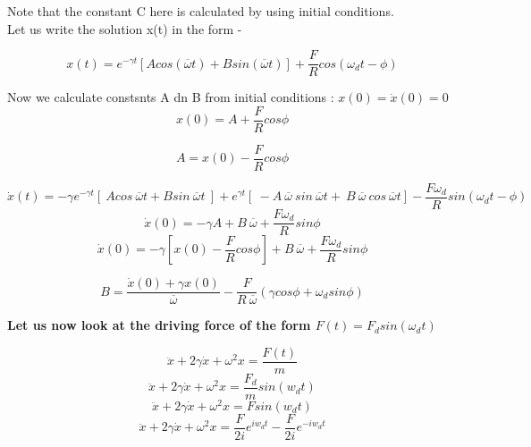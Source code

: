 \documentclass{book}
\begin{document}
Note that the constant C here is calculated by using initial conditions.\\

Let us write the solution x(t) in the form - 
\begin{tcolorbox}[colback=pink!30!white, colframe=black, width=\textwidth, boxrule=0.5mm, sharp corners, left=1mm, right=1mm, top=1mm, bottom=1mm]
\[ x(t) =  e^{- \gamma t}[Acos(\overline{\omega} t) + B sin(\overline{\omega } t)] + \frac{F}{R} cos(\omega_d t - \phi)\]
\end{tcolorbox}

Now we calculate constsnts A dn B from initial conditions : \(x(0) = \dot{x}(0) = 0\)
\[ x(0) = A + \frac{F}{R} cos \phi \] 
\begin{tcolorbox}[colback=blue!20!white, colframe=black, width=\textwidth, boxrule=0.5mm, sharp corners, left=1mm, right=1mm, top=1mm, bottom=1mm]
\[ A = x(0) - \frac{F}{R}  cos \phi\] 
\end{tcolorbox}
\[ \dot{x}(t) =  -\gamma e^{- \gamma t}[ \ Acos\ \overline{\omega} t + B sin \ \overline{\omega } t \ ] + e^{\gamma t} [ \  - A \ \overline{\omega} \ sin \ \overline{\omega} t + \ B \ \overline{\omega} \ cos \ \overline{\omega} t] - \frac{F\omega_d}{R} sin(\omega_d t - \phi)\]
\[ \dot{x}(0) = -\gamma A + B \ \overline{\omega} + \frac{F \omega_d}{R} sin \phi\]
\[ \dot{x}(0) = -\gamma \left[ x(0) - \frac{F}{R} cos \phi \right] + B \ \overline{\omega} + \frac{F \omega_d}{R} sin \phi\]
\begin{tcolorbox}[colback=blue!20!white, colframe=black, width=\textwidth, boxrule=0.5mm, sharp corners, left=1mm, right=1mm, top=1mm, bottom=1mm]
\[ B= \frac{\dot{x}(0) + \gamma x(0)} {\overline{\omega}} - \frac{F}{R \ \overline{\omega}} (\gamma cos \phi + \omega_d sin \phi) \]
\end{tcolorbox}

\noindent
\textbf{Let us now look at the driving force of the form \(F(t) = F_d sin(\omega_d t) \)}

\[ \ddot{x} + 2\gamma \dot{x} + \omega^2 x = \frac{F(t)}{m}\]
\[ \ddot{x} + 2\gamma \dot{x} + \omega^2 x = \frac{F_d}{m} sin(w_d t)\]
\[ \ddot{x} + 2\gamma \dot{x} + \omega^2 x = F sin(w_d t)\]
\[ \ddot{x} + 2\gamma \dot{x} + \omega^2 x = \frac{F}{2i} e^{iw_d t} - \frac{F}{2i} e^{-iw_d t} \]
\end{document}
